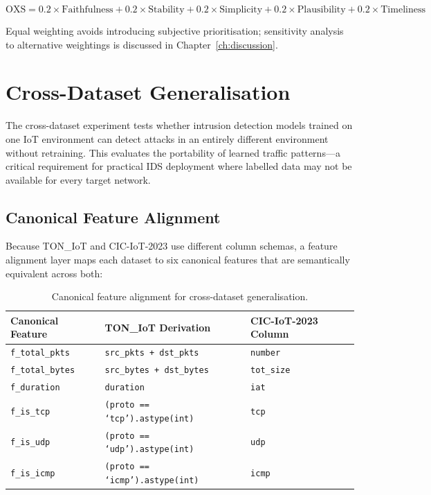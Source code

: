 \documentclass[12pt,a4paper]{report}
\begin{document}
\begin{equation}
\text{OXS} = 0.2 \times \text{Faithfulness} + 0.2 \times \text{Stability} + 0.2 \times \text{Simplicity} + 0.2 \times \text{Plausibility} + 0.2 \times \text{Timeliness}
\end{equation}

Equal weighting avoids introducing subjective prioritisation; sensitivity analysis to alternative weightings is discussed in Chapter~\ref{ch:discussion}.

\section{Cross-Dataset Generalisation}
\label{sec:cross-dataset}

The cross-dataset experiment tests whether intrusion detection models trained on one IoT environment can detect attacks in an entirely different environment without retraining. This evaluates the portability of learned traffic patterns---a critical requirement for practical IDS deployment where labelled data may not be available for every target network.

\subsection{Canonical Feature Alignment}
\label{sec:alignment}

Because TON\_IoT and CIC-IoT-2023 use different column schemas, a feature alignment layer maps each dataset to six canonical features that are semantically equivalent across both:

\begin{table}[H]
\centering
\caption{Canonical feature alignment for cross-dataset generalisation.}
\label{tab:canonical}
\begin{tabular}{lll}
\toprule
\textbf{Canonical Feature} & \textbf{TON\_IoT Derivation} & \textbf{CIC-IoT-2023 Column} \\
\midrule
\texttt{f\_total\_pkts} & \texttt{src\_pkts + dst\_pkts} & \texttt{number} \\
\texttt{f\_total\_bytes} & \texttt{src\_bytes + dst\_bytes} & \texttt{tot\_size} \\
\texttt{f\_duration} & \texttt{duration} & \texttt{iat} \\
\texttt{f\_is\_tcp} & \texttt{(proto == `tcp').astype(int)} & \texttt{tcp} \\
\texttt{f\_is\_udp} & \texttt{(proto == `udp').astype(int)} & \texttt{udp} \\
\texttt{f\_is\_icmp} & \texttt{(proto == `icmp').astype(int)} & \texttt{icmp} \\
\bottomrule
\end{tabular}
\end{table}
\end{document}
